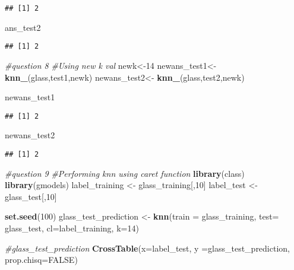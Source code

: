 \documentclass[]{article}
\newenvironment{Shaded}{\begin{snugshade}}{\end{snugshade}}
\newcommand{\KeywordTok}[1]{\textcolor[rgb]{0.13,0.29,0.53}{\textbf{#1}}}
\newcommand{\DataTypeTok}[1]{\textcolor[rgb]{0.13,0.29,0.53}{#1}}
\newcommand{\DecValTok}[1]{\textcolor[rgb]{0.00,0.00,0.81}{#1}}
\newcommand{\StringTok}[1]{\textcolor[rgb]{0.31,0.60,0.02}{#1}}
\newcommand{\CommentTok}[1]{\textcolor[rgb]{0.56,0.35,0.01}{\textit{#1}}}
\newcommand{\OtherTok}[1]{\textcolor[rgb]{0.56,0.35,0.01}{#1}}
\newcommand{\NormalTok}[1]{#1}
\begin{document}
\begin{verbatim}
## [1] 2
\end{verbatim}

\begin{Shaded}
\begin{Highlighting}[]
\NormalTok{ans_test2}
\end{Highlighting}
\end{Shaded}

\begin{verbatim}
## [1] 2
\end{verbatim}

\begin{Shaded}
\begin{Highlighting}[]
\CommentTok{#question 8}
\CommentTok{#Using new k val}
\NormalTok{newk<-}\DecValTok{14}
\NormalTok{newans_test1<-}\StringTok{ }\KeywordTok{knn_}\NormalTok{(glass,test1,newk)}
\NormalTok{newans_test2<-}\StringTok{ }\KeywordTok{knn_}\NormalTok{(glass,test2,newk)}

\NormalTok{newans_test1}
\end{Highlighting}
\end{Shaded}

\begin{verbatim}
## [1] 2
\end{verbatim}

\begin{Shaded}
\begin{Highlighting}[]
\NormalTok{newans_test2}
\end{Highlighting}
\end{Shaded}

\begin{verbatim}
## [1] 2
\end{verbatim}

\begin{Shaded}
\begin{Highlighting}[]
\CommentTok{#question 9}
\CommentTok{#Performing knn using caret function}
\KeywordTok{library}\NormalTok{(class)}
\KeywordTok{library}\NormalTok{(gmodels)}
\NormalTok{label_training <-}\StringTok{ }\NormalTok{glass_training[,}\DecValTok{10}\NormalTok{]}
\NormalTok{label_test <-}\StringTok{ }\NormalTok{glass_test[,}\DecValTok{10}\NormalTok{]}

\KeywordTok{set.seed}\NormalTok{(}\DecValTok{100}\NormalTok{)}
\NormalTok{glass_test_prediction <-}\StringTok{ }\KeywordTok{knn}\NormalTok{(}\DataTypeTok{train =}\NormalTok{ glass_training, }\DataTypeTok{test=}\NormalTok{ glass_test, }\DataTypeTok{cl=}\NormalTok{label_training, }\DataTypeTok{k=}\DecValTok{14}\NormalTok{)}

\CommentTok{#glass_test_prediction}
\KeywordTok{CrossTable}\NormalTok{(}\DataTypeTok{x=}\NormalTok{label_test, }\DataTypeTok{y =}\NormalTok{glass_test_prediction, }\DataTypeTok{prop.chisq=}\OtherTok{FALSE}\NormalTok{)}
\end{Highlighting}
\end{Shaded}
\end{document}
